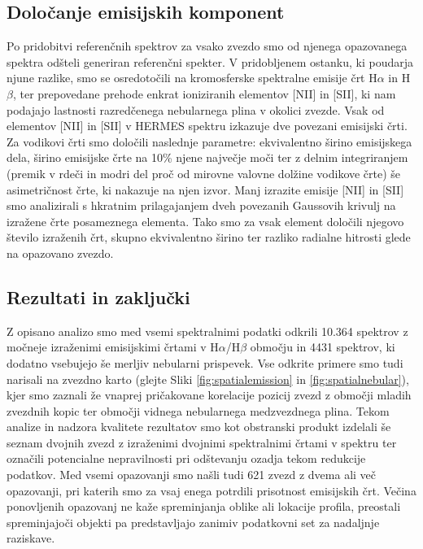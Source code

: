 \subsection{Določanje emisijskih komponent}
Po pridobitvi referenčnih spektrov za vsako zvezdo smo od njenega opazovanega spektra odšteli generiran referenčni spekter. V pridobljenem ostanku, ki poudarja njune razlike, smo se osredotočili na kromosferske spektralne emisije črt H$\alpha$ in H$\beta$, ter prepovedane prehode enkrat ioniziranih elementov [NII] in [SII], ki nam podajajo lastnosti razredčenega nebularnega plina v okolici zvezde. Vsak od elementov [NII] in [SII] v HERMES spektru izkazuje dve povezani emisijski črti. Za vodikovi črti smo določili naslednje parametre: ekvivalentno širino emisijskega dela, širino emisijske črte na 10\% njene največje moči ter z delnim integriranjem (premik v rdeči in modri del proč od mirovne valovne dolžine vodikove črte) še asimetričnost črte, ki nakazuje na njen izvor. Manj izrazite emisije [NII] in [SII] smo analizirali s hkratnim prilagajanjem dveh povezanih Gaussovih krivulj na izražene črte posameznega elementa. Tako smo za vsak element določili njegovo število izraženih črt, skupno ekvivalentno širino ter razliko radialne hitrosti glede na opazovano zvezdo.

\subsection{Rezultati in zaključki}
Z opisano analizo smo med vsemi spektralnimi podatki odkrili 10.364 spektrov z močneje izraženimi emisijskimi črtami v H$\alpha$/H$\beta$ območju in 4431 spektrov, ki dodatno vsebujejo še merljiv nebularni prispevek. Vse odkrite primere smo tudi narisali na zvezdno karto (glejte Sliki \ref{fig:spatialemission} in \ref{fig:spatialnebular}), kjer smo zaznali že vnaprej pričakovane korelacije pozicij zvezd z območji mladih zvezdnih kopic ter območji vidnega nebularnega medzvezdnega plina. Tekom analize in nadzora kvalitete rezultatov smo kot obstranski produkt izdelali še seznam dvojnih zvezd z izraženimi dvojnimi spektralnimi črtami v spektru ter označili potencialne nepravilnosti pri odštevanju ozadja tekom redukcije podatkov. Med vsemi opazovanji smo našli tudi 621 zvezd z dvema ali več opazovanji, pri katerih smo za vsaj enega potrdili prisotnost emisijskih črt. Večina ponovljenih opazovanj ne kaže spreminjanja oblike ali lokacije profila, preostali spreminjajoči objekti pa predstavljajo zanimiv podatkovni set za nadaljnje raziskave.

